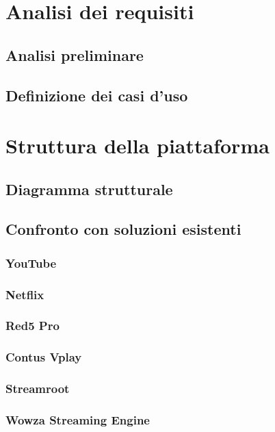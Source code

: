 \section{Analisi dei requisiti}
   \subsection{Analisi preliminare}

   \subsection{Definizione dei casi d'uso}

\section{Struttura della piattaforma}
   \subsection{Diagramma strutturale}

   \subsection{Confronto con soluzioni esistenti}
      \subsubsection{YouTube}
      \subsubsection{Netflix}
      \subsubsection{Red5 Pro}
      \subsubsection{Contus Vplay}
      \subsubsection{Streamroot}
      \subsubsection{Wowza Streaming Engine}

